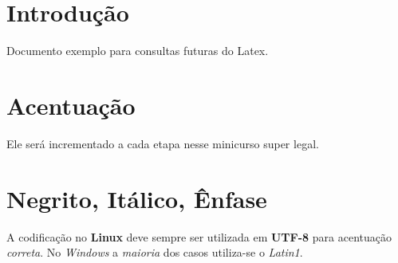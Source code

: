 \documentclass{article}
\begin{document}
	\section{Introdução}
		Documento exemplo para consultas futuras do Latex.

	\section{Acentuação}		
		Ele será incrementado a cada etapa nesse minicurso super legal.
	
	\section{Negrito, Itálico, Ênfase}
		A codificação no \textbf{Linux} deve \huge sempre \normalsize ser utilizada em \textbf{UTF-8} para acentuação \emph{correta}. No \textit{Windows} a \emph{maioria} dos casos utiliza-se o \textit{Latin1}.
\end{document}
